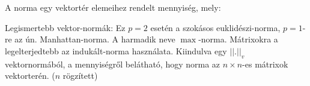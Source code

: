 A norma egy vektortér elemeihez rendelt mennyiség, mely: 
\centerline{}
\centerline{}
\centerline{}

Legismertebb vektor-normák:
Ez $p=2$ esetén a szokásos euklidészi-norma, $p=1$-re az ún. Manhattan-norma. 
A harmadik neve $\max$-norma.\newline
Mátrixokra a legelterjedtebb az indukált-norma használata. Kiindulva egy $||.||_v$ vektornormából, a 
mennyiségről belátható, hogy norma az $n\times n$-es mátrixok vektorterén. ($n$ rögzített)
